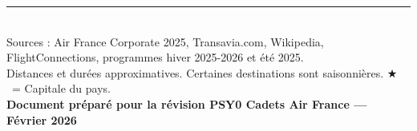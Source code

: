 \documentclass[9pt,a4paper,landscape]{article}
\newcommand{\CAP}{\textcolor{capgold}{$\bigstar$}}
\begin{document}
\vfill
\begin{center}
\rule{0.6\textwidth}{0.5pt}\\[0.15cm]
{\scriptsize Sources : Air France Corporate 2025, Transavia.com, Wikipedia, FlightConnections, programmes hiver 2025-2026 et été 2025.}\\
{\scriptsize Distances et durées approximatives. Certaines destinations sont saisonnières. \CAP\ = Capitale du pays.}\\[0.15cm]
{\small\textbf{Document préparé pour la révision PSY0 Cadets Air France --- Février 2026}}
\end{center}
\end{document}

